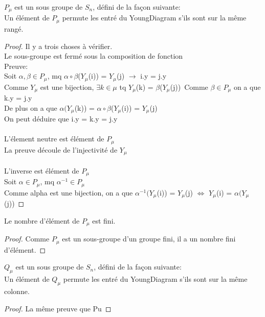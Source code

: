 \begin{definition}[Pu]
    \label{Pu}
    \leanok
    $P_{\mu}$ est un sous groupe de $S_{n}$, défini de la façon suivante:\\
    Un élément de $P_{\mu}$ permute les entré du YoungDiagram s'ils sont sur la même rangé.
\end{definition}
\begin{proof}
    \leanok
    Il y a trois choses à vérifier.\\
    Le sous-groupe est fermé sous la composition de fonction\\
    Preuve:\\
    Soit $\alpha, \beta \in P_{\mu}$, mq $\alpha \circ \beta$($Y_{\mu}$(i)) = $Y_{\mu}$(j) $\to$ i.y = j.y\\
    Comme $Y_{\mu}$ est une bijection, $\exists k \in \mu$ tq $Y_{\mu}$(k) = $\beta$($Y_{\mu}$(j))\
    Comme $\beta \in P_{\mu}$ on a que k.y = j.y\\
    De plus on a que $\alpha (Y_{\mu}$(k)) = $\alpha \circ \beta$($Y_{\mu}$(i)) = $Y_{\mu}$(j)\\
    On peut déduire que i.y = k.y = j.y\\
    \\
    L'élement neutre est élément de $P_{\mu}$\\
    La preuve découle de l'injectivité de $Y_{\mu}$\\
    \\
    L'inverse est élément de $P_{\mu}$\\
    Soit $\alpha \in P_{\mu}$, mq $\alpha^{-1} \in P_{\mu}$\\
    Comme alpha est une bijection, on a que $\alpha^{-1} (Y_{\mu}$(i)) = $Y_{\mu}$(j) $\Leftrightarrow$ $Y_{\mu}$(i) = $\alpha (Y_{\mu}$(j))
\end{proof}

\begin{definition}[PuCard]
    \label{PuCard}
    \leanok
    Le nombre d'élément de $P_{\mu}$ est fini.
\end{definition}
\begin{proof}
    \leanok
    Comme $P_{\mu}$ est un sous-groupe d'un groupe fini, il a un nombre fini d'élément.
\end{proof}

\begin{definition}[Qu]
    \label{Qu}
    \leanok
    $Q_{\mu}$ est un sous groupe de $S_{n}$, défini de la façon suivante:\\
    Un élément de $Q_{\mu}$ permute les entré du YoungDiagram s'ils sont sur la même colonne.
\end{definition}
\begin{proof}
    \leanok
    La même preuve que Pu
\end{proof}

